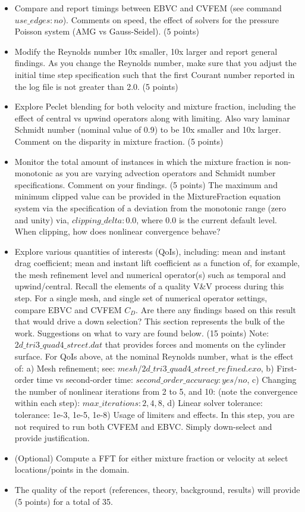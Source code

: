 \documentclass{article}
\begin{document}
\begin{itemize}
	\item Compare and report timings between EBVC and CVFEM (see command $use\_edges: no$). Comments on speed, the effect of solvers for the pressure Poisson system (AMG vs Gauss-Seidel). (5 points)
        \item Modify the Reynolds number 10x smaller, 10x larger and report general findings. 
          As you change the Reynolds number, make sure that you adjust the initial time step 
          specification such that the first Courant number reported in the log file is not greater 
          than 2.0. (5 points)
        \item Explore Peclet blending for both velocity and mixture fraction, including the effect of central vs upwind operators along with limiting. Also vary laminar Schmidt number (nominal value of 0.9) to be 10x smaller and 10x larger. Comment on the disparity in mixture fraction. (5 points)
        \item Monitor the total amount of instances in which the mixture fraction is non-monotonic as you are varying advection operators and Schmidt number specifications. Comment on your findings. (5 points)
          \subitem The maximum and minimum clipped value can be provided in the MixtureFraction
          equation system via the specification of a deviation from the monotonic range (zero and unity)
          via, $clipping\_delta: 0.0$, where $0.0$ is the current default level. When clipping, how does nonlinear 
          convergence behave?
        \item Explore various quantities of interests (QoIs), including: mean and instant drag 
          coefficient; mean and instant lift coefficient as a function of, for example, the mesh refinement level and numerical operator(s) such as temporal and upwind/central. Recall the elements of a quality V\&V process during this step. For a single mesh, and single set of numerical operator settings, compare EBVC and CVFEM $C_D$. Are there any findings based on this result that would drive a down selection? This section represents the bulk of the work. Suggestions on what to vary are found below. (15 points)
        \subitem Note: $2d\_tri3\_quad4\_street.dat$ 
          that provides forces and moments on the cylinder surface. For QoIs above, at the nominal 
          Reynolds number, what is the effect of: a) Mesh refinement; see: 
          $mesh/2d\_tri3\_quad4\_street\_refined.exo$, b) First-order time vs second-order time: 
          $second\_order\_accuracy: yes/no$, c) Changing the number of nonlinear iterations from 2 to 5, 
          and 10: (note the convergence within each step): $max\_iterations: 2, 4, 8$, d) Linear solver 
          tolerance: tolerance: 1e-3, 1e-5, 1e-8) Usage of limiters and effects. In this step, you are not required to run both CVFEM and EBVC. Simply down-select and provide justification.
        \item (Optional) Compute a FFT for either mixture fraction or velocity at select locations/points in the domain. 
        \item The quality of the report (references, theory, background, results) will provide (5 points) for a total of 35.
\end{itemize}
\end{document}
